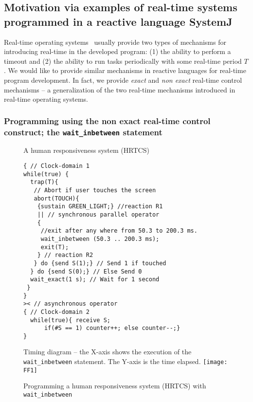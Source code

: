 \subsection{Motivation via examples of real-time systems programmed in a
reactive language SystemJ}
\label{sec:motivating-example}


Real-time operating systems~\cite{barry2009using} usually provide two
types of mechanisms for introducing real-time in the developed program:
(1) the ability to perform a timeout and (2) the ability to run tasks
periodically with some real-time period $T$. We would like to provide
similar mechanisms in reactive languages for real-time program
development. In fact, we provide \textit{exact} and \textit{non exact}
real-time control mechanisms -- a generalization of the two real-time
mechanisms introduced in real-time operating systems.

\subsubsection{Programming using the non exact real-time control
  construct; the \textrm{\texttt{wait\_inbetween}} statement}
\label{sec:progr-using-non}

\begin{figure}[t!]
	\vspace{-10pt}
        \begin{SubFloat}{\label{delaycode:a}A human responsiveness
            system (HRTCS)}
        \begin{lstlisting}[style=sysj,morekeywords={sustain,send,receive,abort,await,emit,present,trap,pause,exit,wait_inbetween,wait_exact,suspend}]
{ // Clock-domain 1
while(true) {
  trap(T){
   // Abort if user touches the screen
   abort(TOUCH){
    {sustain GREEN_LIGHT;} //reaction R1
    || // synchronous parallel operator
    {
     //exit after any where from 50.3 to 200.3 ms.
     wait_inbetween (50.3 .. 200.3 ms); 
     exit(T); 
    } // reaction R2
   } do {send S(1);} // Send 1 if touched 
  } do {send S(0);} // Else Send 0
  wait_exact(1 s); // Wait for 1 second
 }
}
>< // asynchronous operator
{ // Clock-domain 2
  while(true){ receive S; 
      if(#S == 1) counter++; else counter--;}
}
\end{lstlisting}
\end{SubFloat}
\begin{SubFloat}{\label{delaycode:b}Timing diagram -- the X-axis shows
    the execution of the \texttt{wait\_inbetween} statement. The Y-axis
    is the time elapsed.}
    \centering
    \texttt{[image: FF1]}
\end{SubFloat}
\caption{Programming a human responsiveness system (HRTCS) with
  \texttt{wait\_inbetween}}
\label{fig:1}
\end{figure}

